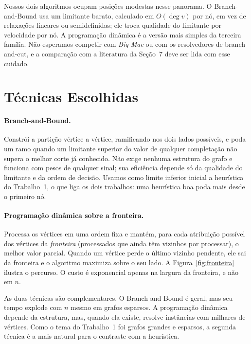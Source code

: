 Nossos dois algoritmos ocupam posições modestas nesse panorama. O Branch-and-Bound usa um limitante barato, calculado em $O(\deg v)$ por nó, em vez de relaxações lineares ou semidefinidas; ele troca qualidade do limitante por velocidade por nó. A programação dinâmica é a versão mais simples da terceira família. Não esperamos competir com \emph{Biq Mac} ou com os resolvedores de branch-and-cut, e a comparação com a literatura da Seção~7 deve ser lida com esse cuidado.

\section{Técnicas Escolhidas}

\paragraph{Branch-and-Bound.} Constrói a partição vértice a vértice, ramificando nos dois lados possíveis, e poda um ramo quando um limitante superior do valor de qualquer completação não supera o melhor corte já conhecido. Não exige nenhuma estrutura do grafo e funciona com pesos de qualquer sinal; sua eficiência depende só da qualidade do limitante e da ordem de decisão. Usamos como limite inferior inicial a heurística do Trabalho~1, o que liga os dois trabalhos: uma heurística boa poda mais desde o primeiro nó.

\paragraph{Programação dinâmica sobre a fronteira.} Processa os vértices em uma ordem fixa e mantém, para cada atribuição possível dos vértices da \emph{fronteira} (processados que ainda têm vizinhos por processar), o melhor valor parcial. Quando um vértice perde o último vizinho pendente, ele sai da fronteira e o algoritmo maximiza sobre o seu lado. A Figura~\ref{fig:fronteira} ilustra o percurso. O custo é exponencial apenas na largura da fronteira, e não em $n$.

As duas técnicas são complementares. O Branch-and-Bound é geral, mas seu tempo explode com $n$ mesmo em grafos esparsos. A programação dinâmica depende da estrutura, mas, quando ela existe, resolve instâncias com milhares de vértices. Como o tema do Trabalho~1 foi grafos grandes e esparsos, a segunda técnica é a mais natural para o contraste com a heurística.

